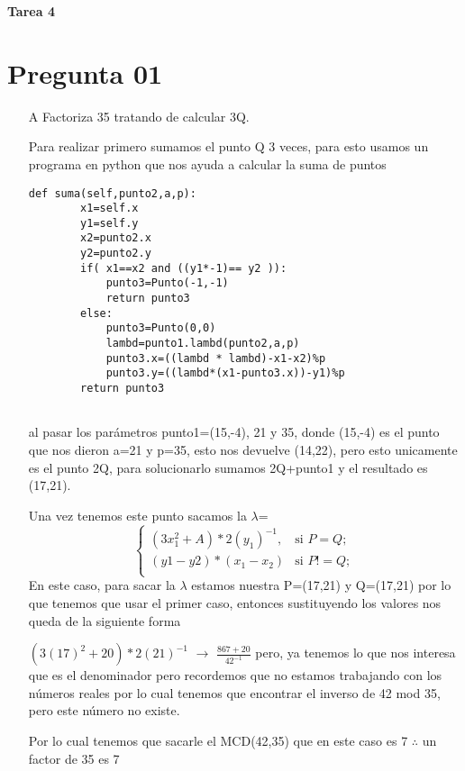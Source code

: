 \documentclass[10pt,a4paper]{article}
\begin{document}
\begin{large}
\textbf{Tarea 4}
\end{large}

\section{Pregunta 01}

\begin{itemize}
\item[A] Factoriza 35 tratando de calcular 3Q.\vspace{.3cm}

Para realizar primero sumamos el punto Q 3 veces, para esto usamos un programa en python que nos ayuda a calcular la suma de puntos

 \begin{lstlisting}
def suma(self,punto2,a,p):
        x1=self.x
        y1=self.y
        x2=punto2.x
        y2=punto2.y
        if( x1==x2 and ((y1*-1)== y2 )):
            punto3=Punto(-1,-1)
            return punto3
        else:
            punto3=Punto(0,0)
            lambd=punto1.lambd(punto2,a,p)
            punto3.x=((lambd * lambd)-x1-x2)%p
            punto3.y=((lambd*(x1-punto3.x))-y1)%p
        return punto3
        
\end{lstlisting}

al pasar los parámetros punto1=(15,-4), 21 y 35, donde (15,-4) es el punto que nos dieron a=21  y p=35, esto nos devuelve (14,22), pero esto unicamente es el punto 2Q, para solucionarlo sumamos 2Q+punto1 y el resultado es (17,21).\vspace{.3cm}

Una vez tenemos este punto sacamos la $\lambda$=\[
\begin{cases}
(3x_1^2+A) *  2(y_1)^{-1}, & \text{si } P=Q ;\\
(y1-y2)*(x_1 - x_2) & \text{si } P!=Q;\\

\end{cases}
\]
En este caso, para sacar la $\lambda$ estamos nuestra P=(17,21) y Q=(17,21) por lo que tenemos que usar el primer caso, entonces sustituyendo los valores nos queda de la siguiente forma\vspace{.3cm}

$(3(17)^2+20) *  2(21)^{-1}$ $\rightarrow$ $\frac{867+20}{42^{-1}}$   pero, ya tenemos lo que nos interesa que es el denominador pero recordemos que no estamos trabajando con los números reales por lo cual  tenemos que encontrar el inverso de 42 mod 35, pero este número no existe.\vspace{.3cm}

Por lo cual tenemos que sacarle el MCD(42,35) que en este caso es 7 $\therefore$ un factor de 35 es 7
\end{itemize}
\end{document}
